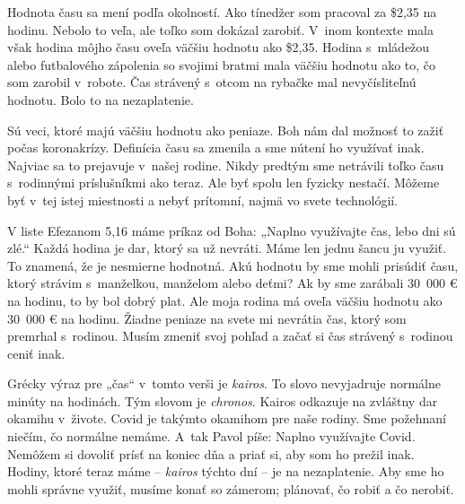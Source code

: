 

Hodnota času sa mení podľa okolností. Ako tínedžer som pracoval za \$2,35 na hodinu. Nebolo to veľa, ale toľko som dokázal zarobiť. V~inom kontexte mala však hodina môjho času oveľa väčšiu hodnotu ako \$2,35. Hodina s~mládežou alebo futbalového zápolenia so svojimi bratmi mala väčšiu hodnotu ako to, čo som zarobil v~robote. Čas strávený s~otcom na rybačke mal nevyčísliteľnú hodnotu. Bolo to na nezaplatenie.

Sú veci, ktoré majú väčšiu hodnotu ako peniaze. Boh nám dal možnosť to zažiť počas koronakrízy. Definícia času sa zmenila a sme nútení ho využívať inak. Najviac sa to prejavuje v~našej rodine. Nikdy predtým sme netrávili toľko času s~rodinnými príslušníkmi ako teraz. Ale byť spolu len fyzicky nestačí. Môžeme byť v~tej istej miestnosti a nebyť prítomní, najmä vo svete technológií.

V liste Efezanom 5,16 máme príkaz od Boha: „Naplno využívajte čas, lebo dni sú zlé.“ Každá hodina je dar, ktorý sa už nevráti. Máme len jednu šancu ju využiť. To znamená, že je nesmierne hodnotná. Akú hodnotu by sme mohli prisúdiť času, ktorý strávim s~manželkou, manželom alebo deťmi? Ak by sme zarábali 30~000 € na hodinu, to by bol dobrý plat. Ale moja rodina má oveľa väčšiu hodnotu ako 30~000 € na hodinu. Žiadne peniaze na svete mi nevrátia čas, ktorý som premrhal s~rodinou. Musím zmeniť svoj pohľad a začať si čas strávený s~rodinou ceniť inak.

Grécky výraz pre „čas“ v~tomto verši je {\it kairos}. To slovo nevyjadruje normálne minúty na hodinách. Tým slovom je {\it chronos}. Kairos odkazuje na zvláštny dar okamihu v~živote. Covid je takýmto okamihom pre naše rodiny. Sme požehnaní niečím, čo normálne nemáme. A~tak Pavol píše: Naplno využívajte Covid. Nemôžem si dovoliť prísť na koniec dňa a priať si, aby som ho prežil inak. Hodiny, ktoré teraz máme – {\it kairos} týchto dní – je na nezaplatenie. Aby sme ho mohli správne využiť, musíme konať so zámerom; plánovať, čo robiť a čo nerobiť.

